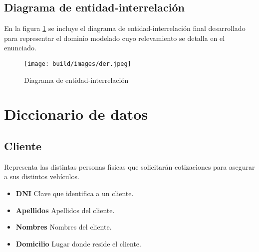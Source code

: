 \documentclass[a4paper,11pt]{article}
\begin{document}
\subsection{Diagrama de entidad-interrelación}

 En la figura \ref{fig:der} se incluye el diagrama de entidad-interrelación
 final desarrollado para representar el dominio modelado cuyo relevamiento se
 detalla en el enunciado.

\begin{figure}[h!t]
  \centering
  \texttt{[image: build/images/der.jpeg]}
  \caption{Diagrama de entidad-interrelación} \label{fig:der}
\end{figure}

\FloatBarrier





  

\section{Diccionario de datos}

\subsection{Cliente}

Representa las distintas personas físicas que solicitarán cotizaciones para asegurar 
a sus distintos vehículos.

\begin{itemize}

  \item \textbf{DNI} Clave que identifica a un cliente.
  
  \item \textbf{Apellidos} Apellidos del cliente.

  \item \textbf{Nombres} Nombres del cliente.
  
  \item \textbf{Domicilio} Lugar donde reside el cliente.
  
\end{itemize}
\end{document}
